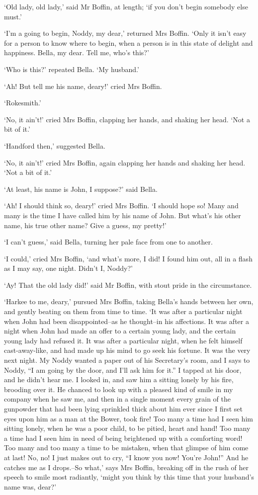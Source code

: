 ‘Old lady, old lady,’ said Mr Boffin, at length; ‘if you don’t begin
somebody else must.’

‘I’m a going to begin, Noddy, my dear,’ returned Mrs Boffin. ‘Only it
isn’t easy for a person to know where to begin, when a person is in this
state of delight and happiness. Bella, my dear. Tell me, who’s this?’

‘Who is this?’ repeated Bella. ‘My husband.’

‘Ah! But tell me his name, deary!’ cried Mrs Boffin.

‘Rokesmith.’

‘No, it ain’t!’ cried Mrs Boffin, clapping her hands, and shaking her
head. ‘Not a bit of it.’

‘Handford then,’ suggested Bella.

‘No, it ain’t!’ cried Mrs Boffin, again clapping her hands and shaking
her head. ‘Not a bit of it.’

‘At least, his name is John, I suppose?’ said Bella.

‘Ah! I should think so, deary!’ cried Mrs Boffin. ‘I should hope so!
Many and many is the time I have called him by his name of John. But
what’s his other name, his true other name? Give a guess, my pretty!’

‘I can’t guess,’ said Bella, turning her pale face from one to another.

‘I could,’ cried Mrs Boffin, ‘and what’s more, I did! I found him out,
all in a flash as I may say, one night. Didn’t I, Noddy?’

‘Ay! That the old lady did!’ said Mr Boffin, with stout pride in the
circumstance.

‘Harkee to me, deary,’ pursued Mrs Boffin, taking Bella’s hands between
her own, and gently beating on them from time to time. ‘It was after a
particular night when John had been disappointed--as he thought--in
his affections. It was after a night when John had made an offer to a
certain young lady, and the certain young lady had refused it. It was
after a particular night, when he felt himself cast-away-like, and had
made up his mind to go seek his fortune. It was the very next night. My
Noddy wanted a paper out of his Secretary’s room, and I says to Noddy,
“I am going by the door, and I’ll ask him for it.” I tapped at his door,
and he didn’t hear me. I looked in, and saw him a sitting lonely by his
fire, brooding over it. He chanced to look up with a pleased kind of
smile in my company when he saw me, and then in a single moment every
grain of the gunpowder that had been lying sprinkled thick about him
ever since I first set eyes upon him as a man at the Bower, took fire!
Too many a time had I seen him sitting lonely, when he was a poor child,
to be pitied, heart and hand! Too many a time had I seen him in need of
being brightened up with a comforting word! Too many and too many a time
to be mistaken, when that glimpse of him come at last! No, no! I just
makes out to cry, “I know you now! You’re John!” And he catches me as
I drops.--So what,’ says Mrs Boffin, breaking off in the rush of her
speech to smile most radiantly, ‘might you think by this time that your
husband’s name was, dear?’

